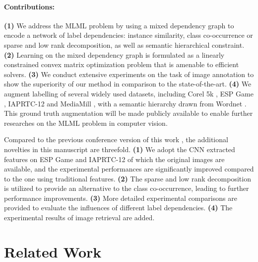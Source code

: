\documentclass[twocolumn]{svjour3}          %
\begin{document}
\vspace{-6pt}\paragraph{Contributions:} \textbf{(1)} We address the MLML problem by using a mixed dependency graph to encode a network of label dependencies: instance similarity, class co-occurrence or sparse and low rank decomposition, as well as semantic hierarchical constraint. \textbf{(2)} Learning on the mixed dependency graph is formulated as a linearly constrained convex matrix optimization problem that is amenable to efficient solvers. \textbf{(3)} We conduct extensive experiments on the task of image annotation to show the superiority of our method in comparison to the state-of-the-art. \textbf{(4)} We augment labelling of several widely used datasets, including Corel 5k \cite{corel5k-eccv-2002}, ESP Game \cite{esp-game-2004}, IAPRTC-12 \cite{iaprtc-12-data-2006} and MediaMill \cite{mediamill-data-2006}, with a  semantic hierarchy drawn from Wordnet \cite{wordnet-1998}. This ground truth augmentation will be made publicly available to enable further researches on the MLML problem in computer vision.

Compared to the previous conference version of this work \cite{my-iccv-2015}, the additional novelties in this manuscript are threefold.  
\textbf{(1)} We adopt the CNN extracted features on ESP Game and IAPRTC-12 of which the original images are available, and the experimental performances are significantly improved compared to the one using traditional features. 
\textbf{(2)} The sparse and low rank decomposition is utilized to provide an alternative to the class co-occurrence, leading to further performance improvements.
\textbf{(3)} More detailed experimental comparisons are provided to evaluate the influences of different label dependencies. 
\textbf{(4)} The experimental results of image retrieval are added.

\section{Related Work} 
\label{sec: 2 related work}
\end{document}
